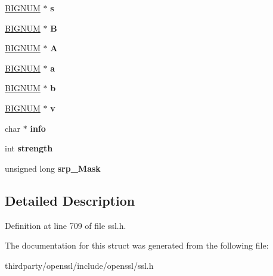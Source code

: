 \begin{DoxyCompactItemize}
\hyperlink{structbignum__st}{B\+I\+G\+N\+UM} $\ast$ {\bfseries s}
\item 
\mbox{\label{structsrp__ctx__st_a7849b7e0d38bddd6243e44f90bc8a48d}} 
\hyperlink{structbignum__st}{B\+I\+G\+N\+UM} $\ast$ {\bfseries B}
\item 
\mbox{\label{structsrp__ctx__st_a65bcccab6ee5eb609c2304fd3a2a7c3f}} 
\hyperlink{structbignum__st}{B\+I\+G\+N\+UM} $\ast$ {\bfseries A}
\item 
\mbox{\label{structsrp__ctx__st_a5d063ec2dc87cc7351ced5b25de67e3f}} 
\hyperlink{structbignum__st}{B\+I\+G\+N\+UM} $\ast$ {\bfseries a}
\item 
\mbox{\label{structsrp__ctx__st_aee9feaedd4dd38b5532c35c3b8b366d5}} 
\hyperlink{structbignum__st}{B\+I\+G\+N\+UM} $\ast$ {\bfseries b}
\item 
\mbox{\label{structsrp__ctx__st_a822ab1c65a312a2baefa2c5f35d48ab4}} 
\hyperlink{structbignum__st}{B\+I\+G\+N\+UM} $\ast$ {\bfseries v}
\item 
\mbox{\label{structsrp__ctx__st_a6ca9932a9bf584ced4514a641da677aa}} 
char $\ast$ {\bfseries info}
\item 
\mbox{\label{structsrp__ctx__st_a7c4b3e2077d11a9ad4b45424bc098148}} 
int {\bfseries strength}
\item 
\mbox{\label{structsrp__ctx__st_a64b3466f134d404daadf0abf37589097}} 
unsigned long {\bfseries srp\+\_\+\+Mask}
\end{DoxyCompactItemize}


\subsection{Detailed Description}


Definition at line 709 of file ssl.\+h.



The documentation for this struct was generated from the following file\+:\begin{DoxyCompactItemize}
\item 
thirdparty/openssl/include/openssl/ssl.\+h\end{DoxyCompactItemize}
